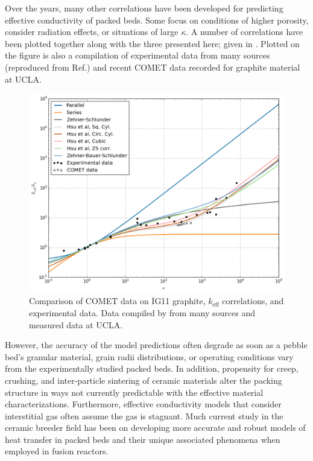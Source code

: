 \documentclass[11pt]{report} %
\begin{document}
Over the years, many other correlations have been developed for predicting effective conductivity of packed beds. Some focus on conditions of higher porosity, consider radiation effects, or situations of large $\kappa$. A number of correlations have been plotted together along with the three presented here; given in . Plotted on the figure is also a compilation of experimental data from many sources (reproduced from Ref.\cite{VanAntwerpen2010}) and recent COMET data recorded for graphite material at UCLA.

\begin{figure}[ht]
    \centering
    \includegraphics[width=\textwidth]{images/keff-kappa-experimental-comet}
    \caption{Comparison of COMET data on IG11 graphite, $k_\text{eff}$ correlations, and experimental data. Data compiled by \cite{VanAntwerpen2010} from many sources and measured data at UCLA.}
    \label{fig:kappa-experimental-comet}
\end{figure}


However, the accuracy of the model predictions often degrade as soon as a pebble bed's granular material, grain radii distributions, or operating conditions vary from the experimentally studied packed beds. In addition, propensity for creep, crushing, and inter-particle sintering of ceramic materials alter the packing structure in ways not currently predictable with the effective material characterizations. Furthermore, effective conductivity models that consider interstitial gas often assume the gas is stagnant. Much current study in the ceramic breeder field has been on developing more accurate and robust models of heat transfer in packed beds and their unique associated phenomena when employed in fusion reactors.
\end{document}
